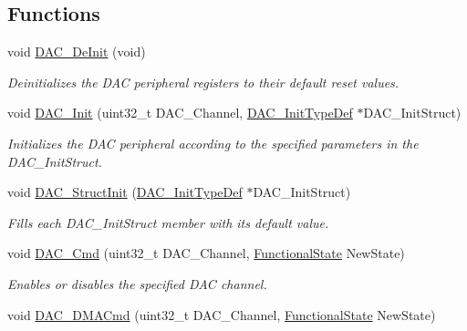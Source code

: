 \subsection*{Functions}
\begin{DoxyCompactItemize}
\item 
void \hyperlink{group___d_a_c___private___functions_ga1fae225204e1e049d6795319e99ba8bc}{D\+A\+C\+\_\+\+De\+Init} (void)
\begin{DoxyCompactList}\small\item\em Deinitializes the D\+AC peripheral registers to their default reset values. \end{DoxyCompactList}\item 
void \hyperlink{group___d_a_c___private___functions_ga7c59850468ed4bf0659663fe495441da}{D\+A\+C\+\_\+\+Init} (uint32\+\_\+t D\+A\+C\+\_\+\+Channel, \hyperlink{struct_d_a_c___init_type_def}{D\+A\+C\+\_\+\+Init\+Type\+Def} $\ast$D\+A\+C\+\_\+\+Init\+Struct)
\begin{DoxyCompactList}\small\item\em Initializes the D\+AC peripheral according to the specified parameters in the D\+A\+C\+\_\+\+Init\+Struct. \end{DoxyCompactList}\item 
void \hyperlink{group___d_a_c___private___functions_gadfc270974d54cb5fa5f92556015c4046}{D\+A\+C\+\_\+\+Struct\+Init} (\hyperlink{struct_d_a_c___init_type_def}{D\+A\+C\+\_\+\+Init\+Type\+Def} $\ast$D\+A\+C\+\_\+\+Init\+Struct)
\begin{DoxyCompactList}\small\item\em Fills each D\+A\+C\+\_\+\+Init\+Struct member with its default value. \end{DoxyCompactList}\item 
void \hyperlink{group___d_a_c___private___functions_ga323e61530d7fa9396c3bce9edb61f733}{D\+A\+C\+\_\+\+Cmd} (uint32\+\_\+t D\+A\+C\+\_\+\+Channel, \hyperlink{group___exported__types_gac9a7e9a35d2513ec15c3b537aaa4fba1}{Functional\+State} New\+State)
\begin{DoxyCompactList}\small\item\em Enables or disables the specified D\+AC channel. \end{DoxyCompactList}\item 
void \hyperlink{group___d_a_c___private___functions_ga194cba38f60ace11658824f0250121f4}{D\+A\+C\+\_\+\+D\+M\+A\+Cmd} (uint32\+\_\+t D\+A\+C\+\_\+\+Channel, \hyperlink{group___exported__types_gac9a7e9a35d2513ec15c3b537aaa4fba1}{Functional\+State} New\+State)

\end{DoxyCompactItemize}
